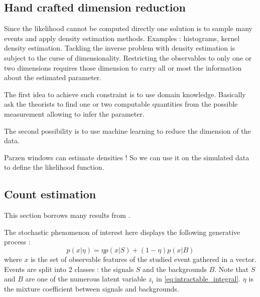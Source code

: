 \subsection{Hand crafted dimension reduction} %
\label{sub:hand_crafted_dimension_reduction}


Since the likelihood cannot be computed directly one solution is to sample many events and apply density estimation methods.
Examples : histograms, kernel density estimation.
Tackling the inverse problem with density estimation is subject to the curse of dimensionality.
Restricting the observables to only one or two dimensions requires those dimension to carry all or most the information about the estimated parameter.

The first idea to achieve such constraint is to use domain knowledge.
Basically ask the theorists to find one or two computable quantities from the possible measurement allowing to infer the parameter.


The second possibility is to use machine learning to reduce the dimension of the data.


Parzen windows can estimate densities !
So we can use it on the simulated data to define the likelihood function.







\subsection{Count estimation} %
\label{sub:count_estimation}

This section borrows many results from \cite{Neal:2007zz}.

The stochastic phenomenon of interest here displays the following generative process :
\begin{equation}
	\label{eq:mixture_model}
	p(x|\eta) = \eta p(x|S) + (1-\eta) p(x|B)
\end{equation}
where $x$ is the set of observable features of the studied event gathered in a vector.
Events are split into 2 classes : the signals $S$ and the backgrounds $B$.
Note that $S$ and $B$ are one of the numerous latent variable $z_i$ in \autoref{eq:intractable_integral}.
$\eta$ is the mixture coefficient between signals and backgrounds.


